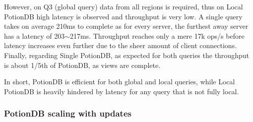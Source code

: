 \documentclass[sigplan,review,anonymous]{acmart}
\begin{document}
However, on Q3 (global query) data from all regions is required, thus on Local PotionDB high latency is observed and throughput is very low.
A single query takes on average 210ms to complete as for every server, the furthest away server has a latency of 203$\sim$217ms.
Throughput reaches only a mere 17k ops/s before latency increases even further due to the sheer amount of client connections.
Finally, regarding Single PotionDB, as expected for both queries the throughput is about 1/5th of PotionDB, as views are complete.

In short, PotionDB is efficient for both global and local queries, while Local PotionDB is heavily hindered by latency for any query that is not fully local.

%
%
%

\subsubsection{PotionDB scaling with updates}
\end{document}
